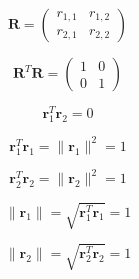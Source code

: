 \documentclass[10pt,twoside]{book}
\newcommand{\fat}[1]{\mathbf{#1}} %
\newcommand{\transp}{^T} %
\begin{document}
$$
\fat{R}
=
\left(
\begin{array}{cc}
r_{1,1} & r_{1,2} \\
r_{2,1} & r_{2,2}
\end{array}
\right)
$$

$$
\fat{R}\transp \fat{R}
=
\left(
\begin{array}{cc}
1 & 0 \\
0 & 1
\end{array}
\right)
$$

$$
\fat{r}_1\transp \fat{r}_2 = 0
$$

$$
\fat{r}_1\transp \fat{r}_1 = \| \fat{r}_1 \|^2 = 1
$$

$$
\fat{r}_2\transp \fat{r}_2 = \| \fat{r}_2 \|^2 = 1
$$

$$
\| \fat{r}_1 \| = \sqrt{ \fat{r}_1\transp \fat{r}_1 } = 1
$$

$$
\| \fat{r}_2 \| = \sqrt{ \fat{r}_2\transp \fat{r}_2 } = 1
$$
\end{document}
